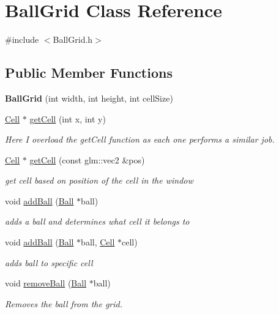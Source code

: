 \hypertarget{classBallGrid}{
\section{BallGrid Class Reference}
\label{classBallGrid}
}


{\ttfamily \#include $<$BallGrid.h$>$}\subsection*{Public Member Functions}
\begin{DoxyCompactItemize}
\item 
\hypertarget{classBallGrid_acdcc4d6951173ed948f47f0dcb929ff9}{
{\bfseries BallGrid} (int width, int height, int cellSize)}
\label{classBallGrid_acdcc4d6951173ed948f47f0dcb929ff9}

\item 
\hypertarget{classBallGrid_a4fc613f1cf978f3e67c4a8bbf4d6f9a8}{
\hyperlink{structCell}{Cell} $\ast$ \hyperlink{classBallGrid_a4fc613f1cf978f3e67c4a8bbf4d6f9a8}{getCell} (int x, int y)}
\label{classBallGrid_a4fc613f1cf978f3e67c4a8bbf4d6f9a8}

\begin{DoxyCompactList}\small\item\em Here I overload the getCell function as each one performs a similar job. \item\end{DoxyCompactList}\item 
\hyperlink{structCell}{Cell} $\ast$ \hyperlink{classBallGrid_a1c1b46810cee5738bc9cdcc98132f37e}{getCell} (const glm::vec2 \&pos)
\begin{DoxyCompactList}\small\item\em get cell based on position of the cell in the window \item\end{DoxyCompactList}\item 
void \hyperlink{classBallGrid_ad3a834b61100b1ca532c47c8b3b68062}{addBall} (\hyperlink{structBall}{Ball} $\ast$ball)
\begin{DoxyCompactList}\small\item\em adds a ball and determines what cell it belongs to \item\end{DoxyCompactList}\item 
void \hyperlink{classBallGrid_a1ee46472584ce1515e22d3a8b5c4f531}{addBall} (\hyperlink{structBall}{Ball} $\ast$ball, \hyperlink{structCell}{Cell} $\ast$cell)
\begin{DoxyCompactList}\small\item\em adds ball to specific cell \item\end{DoxyCompactList}\item 
void \hyperlink{classBallGrid_a468ea1f13fb2e2860e2d393a199a6116}{removeBall} (\hyperlink{structBall}{Ball} $\ast$ball)
\begin{DoxyCompactList}\small\item\em Removes the ball from the grid. \item\end{DoxyCompactList}\end{DoxyCompactItemize}
